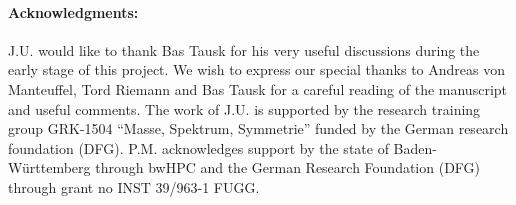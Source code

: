 \documentclass[a4paper,12pt]{scrartcl}
\begin{document}
\paragraph{Acknowledgments:}
J.U. would like to thank Bas Tausk for his very
useful discussions during the early stage of this project. We wish 
to express our special thanks to Andreas von Manteuffel, Tord Riemann and 
Bas Tausk for a careful reading of the manuscript and useful comments.
The work of J.U. is supported by the research training group GRK-1504 ``Masse,
Spektrum, Symmetrie'' funded by the German research foundation (DFG). P.M. 
acknowledges support by the state of Baden-Württemberg through bwHPC and the 
German Research Foundation (DFG) through grant no INST 39/963-1 FUGG.



% 
% 
\end{document}
